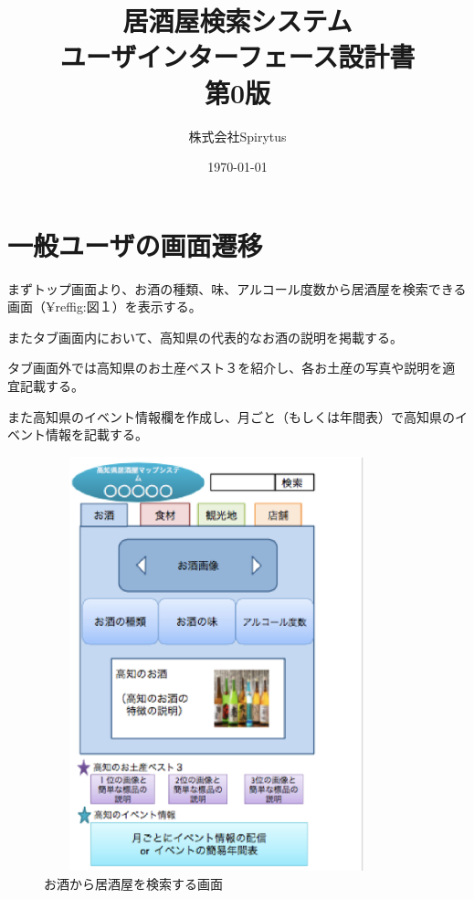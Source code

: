 \documentclass[a4j,titlepage]{jarticle}
\title{居酒屋検索システム\\
ユーザインターフェース設計書\\
第0版}
\author{株式会社Spirytus}
\date{\today}
\begin{document}
\maketitle
\tableofcontents

\section{一般ユーザの画面遷移}



まずトップ画面より、お酒の種類、味、アルコール度数から居酒屋を検索できる画面（¥ref{fig:図１}）を表示する。



またタブ画面内において、高知県の代表的なお酒の説明を掲載する。



タブ画面外では高知県のお土産ベスト３を紹介し、各お土産の写真や説明を適宜記載する。



また高知県のイベント情報欄を作成し、月ごと（もしくは年間表）で高知県のイベント情報を記載する。



\begin {figure}[!htbp]
    \begin{center}
    \includegraphics [height=12cm, width=10cm]{1.eps}
    \caption {お酒から居酒屋を検索する画面}
    \label {fig:1}
    \end{center}
\end {figure}
\end{document}
